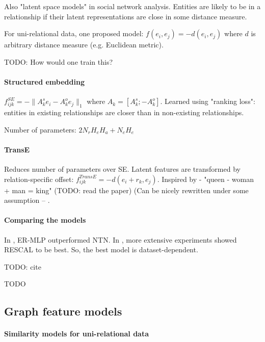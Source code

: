 Also "latent space models" in social network analysis. Entities are likely to be
in a relationship if their latent representations are close in some distance
measure.

For uni-relational data, one proposed model: $f(e_i,e_j)=-d(e_i,e_j)$ where $d$
is arbitrary distance measure (e.g. Euclidean metric).

TODO: How would one train this?

\paragraph{Structured embedding}

$f_{ijk}^{SE}=-\|A_k^s e_i - A_k^o e_j\|_1$ where $A_k=[A_k^s; -A_k^o]$.
Learned using "ranking loss": entities in existing relationships are closer than
in non-existing relationships.

Number of parameters: $2N_r H_e H_a + N_e H_e$

\paragraph{TransE}

Reduces number of parameters over SE.
Latent features are transformed by relation-specific offset:
$f_{ijk}^{TransE}=-d(e_i+r_k,e_j)$.
Inspired by \cite{efficient-word-representation-estimation} - "queen - woman
+ man = king" (TODO: read the paper)
(Can be nicely rewritten under some assumption --
\cite{review-of-relational-ml-for-kgs}.

\paragraph{Comparing the models}

In \cite{knowledge-vault}, ER-MLP outperformed NTN.
In \cite{embedding-entities-and-relations}, more extensive experiments showed
RESCAL to be best.
So, the best model is dataset-dependent.

TODO: cite

TODO

\subsection{Graph feature models}

\paragraph{Similarity models for uni-relational data}

